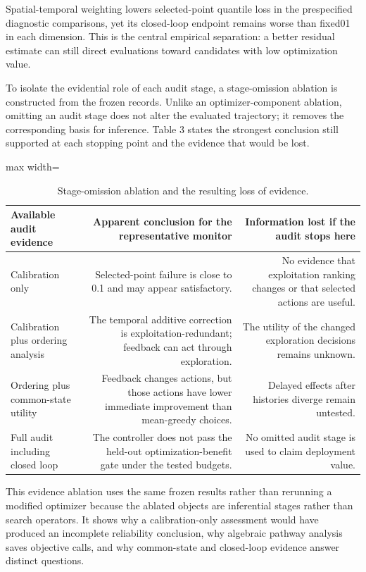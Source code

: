 \documentclass[cmc,article,submit,moreauthors,pdftex]{Definitions/tsp}
\begin{document}
Spatial-temporal weighting lowers selected-point quantile loss in the prespecified diagnostic comparisons, yet its closed-loop endpoint remains worse than fixed01 in each dimension. This is the central empirical separation: a better residual estimate can still direct evaluations toward candidates with low optimization value.

To isolate the evidential role of each audit stage, a stage-omission ablation is constructed from the frozen records. Unlike an optimizer-component ablation, omitting an audit stage does not alter the evaluated trajectory; it removes the corresponding basis for inference. Table 3 states the strongest conclusion still supported at each stopping point and the evidence that would be lost.

\begin{table}[H]
\tablesize{\scriptsize}
\caption{Stage-omission ablation and the resulting loss of evidence.}
\label{tab:main-3}
\centering
\begin{adjustbox}{max width=\textwidth}
\begin{tabular}{lrr}
\toprule
\textbf{Available audit evidence} & \textbf{Apparent conclusion for the representative monitor} & \textbf{Information lost if the audit stops here} \\
\midrule
Calibration only & Selected-point failure is close to 0.1 and may appear satisfactory. & No evidence that exploitation ranking changes or that selected actions are useful. \\
Calibration plus ordering analysis & The temporal additive correction is exploitation-redundant; feedback can act through exploration. & The utility of the changed exploration decisions remains unknown. \\
Ordering plus common-state utility & Feedback changes actions, but those actions have lower immediate improvement than mean-greedy choices. & Delayed effects after histories diverge remain untested. \\
Full audit including closed loop & The controller does not pass the held-out optimization-benefit gate under the tested budgets. & No omitted audit stage is used to claim deployment value. \\
\bottomrule
\end{tabular}
\end{adjustbox}
\end{table}

This evidence ablation uses the same frozen results rather than rerunning a modified optimizer because the ablated objects are inferential stages rather than search operators. It shows why a calibration-only assessment would have produced an incomplete reliability conclusion, why algebraic pathway analysis saves objective calls, and why common-state and closed-loop evidence answer distinct questions.
\end{document}
